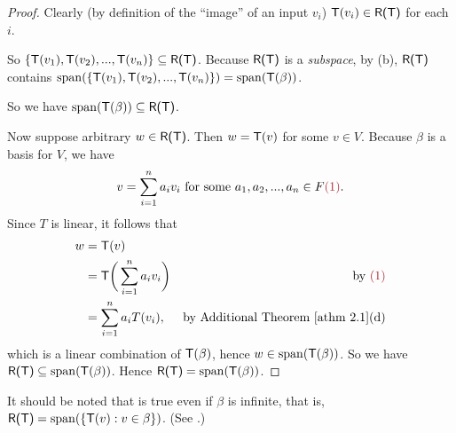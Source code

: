 \begin{proof} Clearly (by definition of the ``image'' of an input \(v_i\)) \(\textsf{T}(v_i) \in \textsf{R(T)}\) for each \(i\).

So \(\{ \textsf{T}(v_1), \textsf{T}(v_2), ..., \textsf{T}(v_n) \} \subseteq \textsf{R(T)}\).
Because \(\textsf{R(T)}\) is a \emph{subspace}, by (b), \(\textsf{R(T)}\) contains \(\operatorname{span}(\{ \textsf{T}(v_1 ), \textsf{T}(v_2), ..., \textsf{T}(v_n) \}) = \operatorname{span}(\textsf{T}(\beta))\).

So we have \(\operatorname{span}(\textsf{T}(\beta)) \subseteq \textsf{R(T)}\).

Now suppose arbitrary \(w \in \textsf{R(T)}\).
Then \(w = \textsf{T}(v)\) for some \(v \in V\).
Because \(\beta\) is a basis for \(V\), we have
\[
    v = \sum_{i = 1}^n a_i v_i \text{ for some \(a_1, a_2, ..., a_n \in F\)} \MAROON{(1)}.
\]
Since \(T\) is linear, it follows that
\begin{align*}
    w & = \T(v) \\
      & = \T \bigg(\sum_{i = 1}^n a_i v_i \bigg) & \text{by \MAROON{(1)}} \\
      & = \sum_{i = 1}^n a_i T(v_i), & \text{by \ATHM{2.1}(d)} \\
\end{align*}
which is a linear combination of \(\textsf{T}(\beta)\), hence \(w \in \operatorname{span}(\textsf{T}(\beta))\).
So we have \(\textsf{R(T)} \subseteq \operatorname{span}(\textsf{T}(\beta))\).
Hence \(\textsf{R(T)} = \operatorname{span}(\textsf{T}(\beta))\).
\end{proof}

\begin{remark} \label{remark 2.1.5}
It should be noted that  is true even if \(\beta\) is infinite, that is, \(\textsf{R(T)} = \operatorname{span}(\{ \textsf{T}(v) : v \in \beta \})\).
(See .)
\end{remark}

